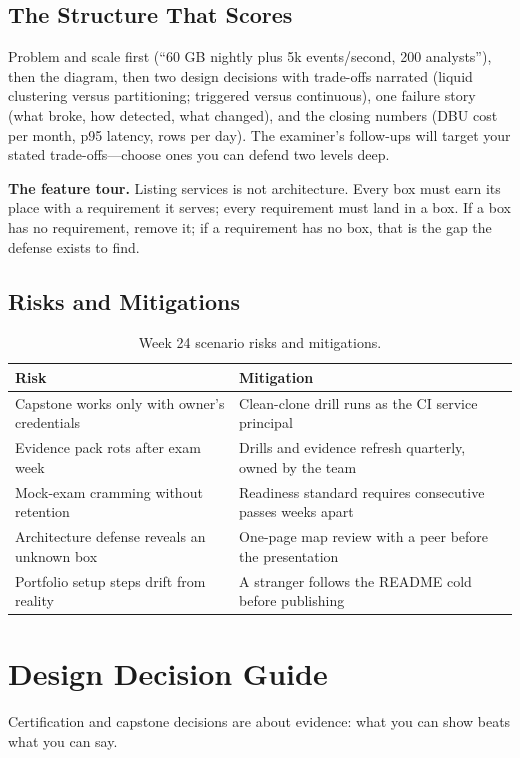 \subsection{The Structure That Scores}
Problem and scale first (``60 GB nightly plus 5k events/second, 200 analysts''), then the diagram, then two design decisions with trade-offs narrated (liquid clustering versus partitioning; triggered versus continuous), one failure story (what broke, how detected, what changed), and the closing numbers (DBU cost per month, p95 latency, rows per day). The examiner's follow-ups will target your stated trade-offs---choose ones you can defend two levels deep.

\begin{pitfall}
\textbf{The feature tour.} Listing services is not architecture. Every box must earn its place with a requirement it serves; every requirement must land in a box. If a box has no requirement, remove it; if a requirement has no box, that is the gap the defense exists to find.
\end{pitfall}

\subsection{Risks and Mitigations}
\begin{table}[H]
\centering
\small
\begin{tabular}{@{}p{4.6cm}p{7.6cm}@{}}
\toprule
\textbf{Risk} & \textbf{Mitigation} \\
\midrule
Capstone works only with owner's credentials & Clean-clone drill runs as the CI service principal \\
Evidence pack rots after exam week & Drills and evidence refresh quarterly, owned by the team \\
Mock-exam cramming without retention & Readiness standard requires consecutive passes weeks apart \\
Architecture defense reveals an unknown box & One-page map review with a peer before the presentation \\
Portfolio setup steps drift from reality & A stranger follows the README cold before publishing \\
\bottomrule
\end{tabular}
\caption{Week 24 scenario risks and mitigations.}
\label{tab:ch24-risks}
\end{table}

\section{Design Decision Guide}
%
Certification and capstone decisions are about evidence: what you can show beats what you can say.

